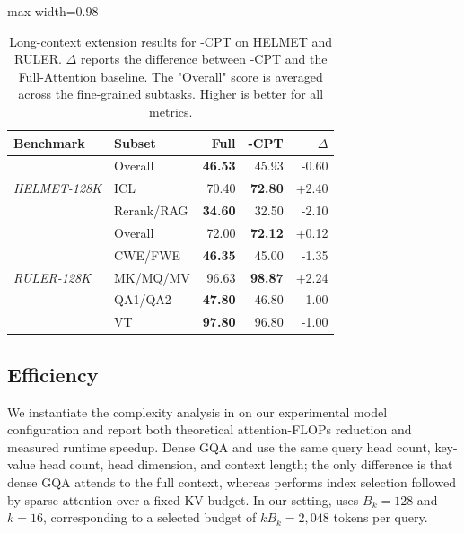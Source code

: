\begin{table}[H]
\centering
\caption{Long-context extension results for \method{}-CPT on HELMET and RULER. \(\Delta\) reports the difference between \method{}-CPT and the Full-Attention baseline. The "Overall" score is averaged across the fine-grained subtasks. Higher is better for all metrics.}
\label{tab:lctx-main}
{\small
\renewcommand{\arraystretch}{0.92}
\begin{adjustbox}{max width=0.98\linewidth}
\begin{tabular}{llrrr}
\toprule
Benchmark & Subset & Full & \method{}-CPT & $\Delta$ \\
\midrule
\multirow{3}{*}{\textit{HELMET-128K}} & Overall & \textbf{46.53} & 45.93 & -0.60 \\
 & ICL & 70.40 & \textbf{72.80} & +2.40 \\
 & Rerank/RAG & \textbf{34.60} & 32.50 & -2.10 \\
\midrule
\multirow{5}{*}{\textit{RULER-128K}} & Overall & 72.00 & \textbf{72.12} & +0.12 \\
 & CWE/FWE & \textbf{46.35} & 45.00 & -1.35 \\
 & MK/MQ/MV & 96.63 & \textbf{98.87} & +2.24 \\
 & QA1/QA2 & \textbf{47.80} & 46.80 & -1.00 \\
 & VT & \textbf{97.80} & 96.80 & -1.00 \\
\bottomrule
\end{tabular}
\end{adjustbox}
}
\end{table}

\subsection{Efficiency}
\label{sec:experiment-efficiency}

We instantiate the complexity analysis in  on our experimental model configuration and report both theoretical attention-FLOPs reduction and measured runtime speedup. Dense GQA and \method{} use the same query head count, key-value head count, head dimension, and context length; the only difference is that dense GQA attends to the full context, whereas \method{} performs index selection followed by sparse attention over a fixed KV budget. In our setting, \method{} uses $B_k=128$ and $k=16$, corresponding to a selected budget of $k B_k=2{,}048$ tokens per query.

